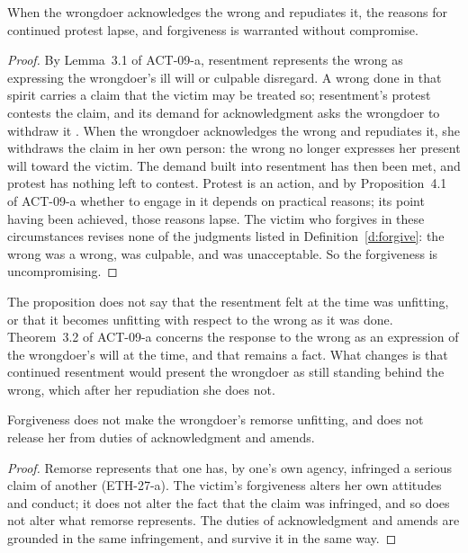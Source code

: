 \documentclass{situationist-preprint}
\begin{document}
\begin{proposition}\label{p:lapse}
When the wrongdoer acknowledges the wrong and repudiates it, the reasons for continued protest lapse, and forgiveness is warranted without compromise.
\end{proposition}

\begin{proof}
By Lemma~3.1 of ACT-09-a, resentment represents the wrong as expressing the wrongdoer's ill will or culpable disregard. A wrong done in that spirit carries a claim that the victim may be treated so; resentment's protest contests the claim, and its demand for acknowledgment asks the wrongdoer to withdraw it \citep{Hieronymi2001}. When the wrongdoer acknowledges the wrong and repudiates it, she withdraws the claim in her own person: the wrong no longer expresses her present will toward the victim. The demand built into resentment has then been met, and protest has nothing left to contest. Protest is an action, and by Proposition~4.1 of ACT-09-a whether to engage in it depends on practical reasons; its point having been achieved, those reasons lapse. The victim who forgives in these circumstances revises none of the judgments listed in Definition~\ref{d:forgive}: the wrong was a wrong, was culpable, and was unacceptable. So the forgiveness is uncompromising.
\end{proof}

The proposition does not say that the resentment felt at the time was unfitting, or that it becomes unfitting with respect to the wrong as it was done. Theorem~3.2 of ACT-09-a concerns the response to the wrong as an expression of the wrongdoer's will at the time, and that remains a fact. What changes is that continued resentment would present the wrongdoer as still standing behind the wrong, which after her repudiation she does not.

\begin{proposition}\label{p:remains}
Forgiveness does not make the wrongdoer's remorse unfitting, and does not release her from duties of acknowledgment and amends.
\end{proposition}

\begin{proof}
Remorse represents that one has, by one's own agency, infringed a serious claim of another (ETH-27-a). The victim's forgiveness alters her own attitudes and conduct; it does not alter the fact that the claim was infringed, and so does not alter what remorse represents. The duties of acknowledgment and amends are grounded in the same infringement, and survive it in the same way.
\end{proof}
\end{document}
